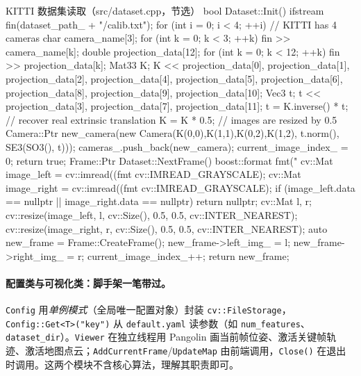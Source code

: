 \begin{codebox}[C++]{KITTI 数据集读取（src/dataset.cpp，节选）}
bool Dataset::Init() {
    ifstream fin(dataset_path_ + "/calib.txt");
    for (int i = 0; i < 4; ++i) {                  // KITTI has 4 cameras
        char camera_name[3];
        for (int k = 0; k < 3; ++k) fin >> camera_name[k];
        double projection_data[12];
        for (int k = 0; k < 12; ++k) fin >> projection_data[k];
        Mat33 K;
        K << projection_data[0], projection_data[1], projection_data[2],
             projection_data[4], projection_data[5], projection_data[6],
             projection_data[8], projection_data[9], projection_data[10];
        Vec3 t;
        t << projection_data[3], projection_data[7], projection_data[11];
        t = K.inverse() * t;                       // recover real extrinsic translation
        K = K * 0.5;                               // images are resized by 0.5
        Camera::Ptr new_camera(new Camera(K(0,0),K(1,1),K(0,2),K(1,2),
                                          t.norm(), SE3(SO3(), t)));
        cameras_.push_back(new_camera);
    }
    current_image_index_ = 0;
    return true;
}
Frame::Ptr Dataset::NextFrame() {
    boost::format fmt("%
    cv::Mat image_left  = cv::imread((fmt %
                                     cv::IMREAD_GRAYSCALE);
    cv::Mat image_right = cv::imread((fmt %
                                     cv::IMREAD_GRAYSCALE);
    if (image_left.data == nullptr || image_right.data == nullptr) return nullptr;
    cv::Mat l, r;
    cv::resize(image_left,  l, cv::Size(), 0.5, 0.5, cv::INTER_NEAREST);
    cv::resize(image_right, r, cv::Size(), 0.5, 0.5, cv::INTER_NEAREST);
    auto new_frame = Frame::CreateFrame();
    new_frame->left_img_ = l; new_frame->right_img_ = r;
    current_image_index_++;
    return new_frame;
}
\end{codebox}

\paragraph{配置类与可视化类：脚手架一笔带过。}
\texttt{Config} 用\emph{单例模式}（全局唯一配置对象）封装 \texttt{cv::FileStorage}，\verb|Config::Get<T>("key")| 从 \texttt{default.yaml} 读参数（如 \texttt{num\_features}、\texttt{dataset\_dir}）。\texttt{Viewer} 在独立线程用 Pangolin 画当前帧位姿、激活关键帧轨迹、激活地图点云；\texttt{AddCurrentFrame}/\texttt{UpdateMap} 由前端调用，\texttt{Close()} 在退出时调用。这两个模块不含核心算法，理解其职责即可。

